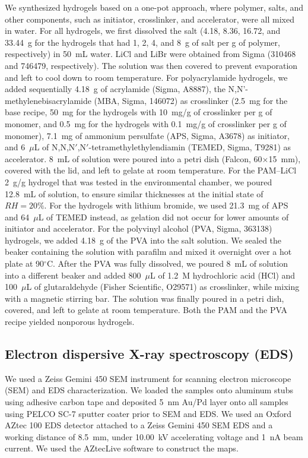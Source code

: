 \documentclass[11pt]{article}
\begin{document}
We synthesized hydrogels based on a one-pot approach, where polymer, salts, and other components, such as initiator, crosslinker, and accelerator, were all mixed in water. For all hydrogels, we first dissolved the salt (4.18, 8.36, 16.72, and 33.44~g for the hydrogels that had 1, 2, 4, and 8~g of salt per g of polymer, respectively) in 50~mL water. LiCl and LiBr were obtained from Sigma (310468 and 746479, respectively). The solution was then covered to prevent evaporation and left to cool down to room temperature. For polyacrylamide hydrogels, we added sequentially 4.18~g of acrylamide (Sigma, A8887), the N,N'-methylenebisacrylamide (MBA, Sigma, 146072) as crosslinker (2.5~mg for the base recipe, 50~mg for the hydrogels with 10~mg/g of crosslinker per g of monomer, and 0.5~mg for the hydrogels with 0.1~mg/g of crosslinker per g of monomer), 7.1~mg of ammonium persulfate (APS, Sigma, A3678) as initiator, and 6~$\mu$L of N,N,N$'$,N$'$-tetramethylethylendiamin (TEMED, Sigma, T9281) as accelerator. 8~mL of solution were poured into a petri dish (Falcon, 60$\times$15~mm), covered with the lid, and left to gelate at room temperature. For the PAM--LiCl 2~g/g hydrogel that was tested in the environmental chamber, we poured 12.8~mL of solution, to ensure similar thicknesses at the initial state of $RH = 20\%$. For the hydrogels with lithium bromide, we used 21.3~mg of APS and 64~$\mu$L of TEMED instead, as gelation did not occur for lower amounts of initiator and accelerator. For the polyvinyl alcohol (PVA, Sigma, 363138) hydrogels, we added 4.18~g of the PVA into the salt solution. We sealed the beaker containing the solution with parafilm and mixed it overnight over a hot plate at 90$^\circ$C. After the PVA was fully dissolved, we poured 8~mL of solution into a different beaker and added 800~$\mu$L of 1.2~M hydrochloric acid (HCl) and 100~$\mu$L of glutaraldehyde (Fisher Scientific, O29571) as crosslinker, while mixing with a magnetic stirring bar. The solution was finally poured in a petri dish, covered, and left to gelate at room temperature. Both the PAM and the PVA recipe yielded nonporous hydrogels.

\subsection{Electron dispersive X-ray spectroscopy (EDS)}

We used a Zeiss Gemini 450 SEM instrument for scanning electron microscope (SEM) and EDS characterization. We loaded the samples onto aluminum stubs using adhesive carbon tape and deposited 5~nm Au/Pd layer onto all samples using PELCO SC-7 sputter coater prior to SEM and EDS. We used an Oxford AZtec 100 EDS detector attached to a Zeiss Gemini 450 SEM EDS and a working distance of 8.5~mm, under 10.00~kV accelerating voltage and 1~nA beam current. We used the AZtecLive software to construct the maps.
\end{document}
